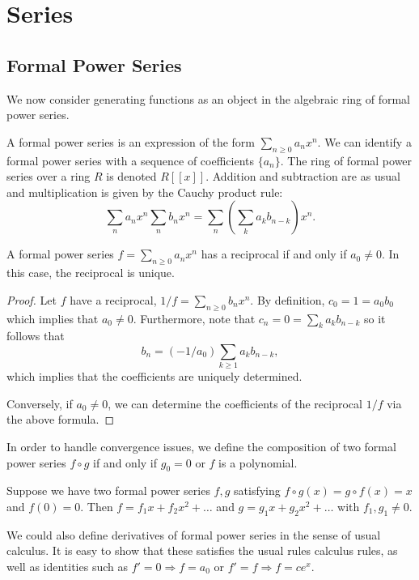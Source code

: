 \documentclass[11pt]{article}
\renewcommand{\>}{\rangle}
\newcommand{\<}{\langle}
\begin{document}
\section{Series}
\subsection{Formal Power Series}
We now consider generating functions as an object in the algebraic ring of formal power series.  
\begin{definition} A formal power series is an expression of the form $\sum_{n \ge 0} a_n x^n$.  We can identify a formal power series with a sequence of coefficients $\{a_n\}$.  The ring of formal power series over a ring $R$ is denoted $R[[x]]$.  Addition and subtraction are as usual and multiplication is given by the Cauchy product rule:
$$\sum_n a_n x^n \sum_n b_n x^n = \sum_n \left(\sum_k a_kb_{n-k}\right) x^n.$$
\end{definition}

\begin{proposition} A formal power series $f = \sum_{n \ge 0} a_nx^n$ has a reciprocal if and only if $a_0 \ne 0$.  In this case, the reciprocal is unique.  
\end{proposition}
\begin{proof}
Let $f$ have a reciprocal, $1/f = \sum_{n \ge 0} b_n x^n$.  By definition, $c_0 = 1 = a_0b_0$ which implies that $a_0 \ne 0$.  Furthermore, note that $c_n = 0 = \sum_{k} a_kb_{n-k}$ so it follows that 
$$b_n = (-1/a_0) \sum_{k \ge 1} a_kb_{n-k},$$
which implies that the coefficients are uniquely determined.  

Conversely, if $a_0 \ne 0$, we can determine the coefficients of the reciprocal $1/f$ via the above formula.  
\end{proof}

\begin{remark}
In order to handle convergence issues, we define the composition of two formal power series $f \circ g$ if and only if $g_0 = 0$ or $f$ is a polynomial.  
\end{remark} 
 \begin{proposition} Suppose we have two formal power series $f, g$ satisfying $f \circ g (x) = g \circ f (x) =x $ and $f(0) = 0$.  Then $f = f_1 x + f_2 x^2 + \dots$ and $g = g_1 x + g_2 x^2 + \dots$ with $f_1, g_1 \ne 0$.
 \end{proposition}
 
 We could also define derivatives of formal power series in the sense of usual calculus.  It is easy to show that these satisfies the usual rules calculus rules, as well as identities such as $f' = 0 \Rightarrow f = a_0$ or $f' = f \Rightarrow f = ce^x$.
 \pagebreak
\end{document}
